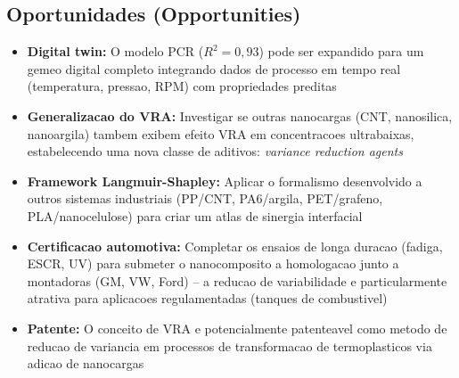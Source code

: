 \documentclass[11pt,a4paper,oneside]{article}
\begin{document}
\subsection{Oportunidades (Opportunities)}
\begin{itemize}[nosep]
    \item {\bfseries Digital twin:} O modelo PCR ($R^2{=}0{,}93$) pode ser expandido para um gemeo digital completo integrando dados de processo em tempo real (temperatura, pressao, RPM) com propriedades preditas
    \item {\bfseries Generalizacao do VRA:} Investigar se outras nanocargas (CNT, nanosilica, nanoargila) tambem exibem efeito VRA em concentracoes ultrabaixas, estabelecendo uma nova classe de aditivos: \textit{variance reduction agents}
    \item {\bfseries Framework Langmuir-Shapley:} Aplicar o formalismo desenvolvido a outros sistemas industriais (PP/CNT, PA6/argila, PET/grafeno, PLA/nanocelulose) para criar um atlas de sinergia interfacial
    \item {\bfseries Certificacao automotiva:} Completar os ensaios de longa duracao (fadiga, ESCR, UV) para submeter o nanocomposito a homologacao junto a montadoras (GM, VW, Ford) -- a reducao de variabilidade e particularmente atrativa para aplicacoes regulamentadas (tanques de combustivel)
    \item {\bfseries Patente:} O conceito de VRA e potencialmente patenteavel como metodo de reducao de variancia em processos de transformacao de termoplasticos via adicao de nanocargas
\end{itemize}
\end{document}
